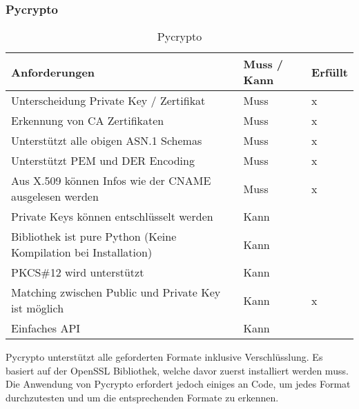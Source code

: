 \subsubsection{Pycrypto \cite{pycrypto}}
\begin{table}[H]
\centering
    \begin{tabular}{|p{12cm}|l|l|}
    \hline
    \rowcolor{lightblue}
    Anforderungen & Muss / Kann & Erfüllt   \\ \hline
	Unterscheidung Private Key / Zertifikat	&	Muss & x \\ \hline	
	Erkennung von CA Zertifikaten	&	Muss	& x \\ \hline	
	Unterstützt alle obigen ASN.1 Schemas	&	Muss	& x \\ \hline		
	Unterstützt PEM und DER Encoding	&	Muss	&  x \\ \hline	
	Aus X.509 können Infos wie der CNAME ausgelesen werden &	Muss	& x \\ \hline	
	Private Keys können entschlüsselt werden &	Kann &  \\ \hline
	Bibliothek ist pure Python (Keine Kompilation bei Installation) &	Kann	&   \\ \hline
	PKCS\#12 wird unterstützt &	Kann &  \\ \hline
	Matching zwischen Public und Private Key ist möglich &	Kann &  x \\ \hline
	Einfaches API &	Kann &  \\ \hline
	\end{tabular}
    \caption[Pycrypto]{Pycrypto}
\end{table}
\medskip
Pycrypto unterstützt alle geforderten Formate inklusive Verschlüsslung. Es basiert auf der OpenSSL Bibliothek, welche davor zuerst installiert werden muss. Die Anwendung von Pycrypto erfordert jedoch einiges an Code, um jedes Format durchzutesten und um die entsprechenden Formate zu erkennen.\\


